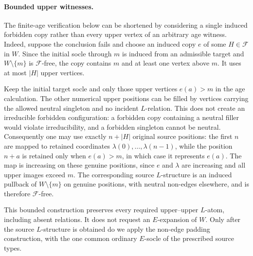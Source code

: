 \paragraph{Bounded upper witnesses.}
The finite-age verification below can be shortened by considering a
single induced forbidden copy rather than every upper vertex of an
arbitrary age witness.  Indeed, suppose the conclusion fails and
choose an induced copy $e$ of some $H\in\mathcal F$ in $W$.
Since the initial socle through $m$ is induced from an admissible
target and $W\setminus\{m\}$ is $\mathcal F$-free, the copy contains
$m$ and at least one vertex above $m$.  It uses at most $|H|$
upper vertices.

Keep the initial target socle and only those upper vertices $e(a)>m$
in the age calculation.  The other numerical upper positions can be
filled by vertices carrying the allowed neutral singleton and no
incident $L$-relation.  This does not create an irreducible forbidden
configuration: a forbidden copy containing a neutral filler would
violate irreducibility, and a forbidden singleton cannot be neutral.
Consequently one may use exactly $n+|H|$ original source positions:
the first $n$ are mapped to retained coordinates
$\lambda(0),\ldots,\lambda(n-1)$, while the position $n+a$
is retained only when $e(a)>m$, in which case it represents $e(a)$.
The map is increasing on these genuine positions, since $e$ and
$\lambda$ are increasing and all upper images exceed $m$.
The corresponding source $L$-structure is an induced pullback of
$W\setminus\{m\}$ on genuine positions, with neutral non-edges
elsewhere, and is therefore $\mathcal F$-free.

This bounded construction preserves every required upper--upper
$L$-atom, including absent relations.  It does not request an
$E$-expansion of $W$.  Only after the source $L$-structure is obtained
do we apply the non-edge padding construction, with the one common
ordinary $E$-socle of the prescribed source types.

